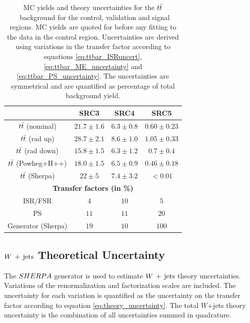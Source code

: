 \begin{table}[!h]
\begin{center}
      \begin{tabular}{|c|c|c|c|}
	\noalign{\smallskip}\noalign{\smallskip}\hline
          & SRC3 & SRC4 & SRC5 \\
        \hline
$t\bar{t}$ (nominal) &         $21.7\pm 1.6 $&         $6.3\pm 0.8 $&          $0.60\pm 0.23 $\\
$t\bar{t}$ (rad up)&         $28.7\pm 2.1 $&         $8.6\pm 1.0 $&  $1.05\pm 0.33 $\\
$t\bar{t}$ (rad down)&         $15.8\pm 1.5 $&         $6.3\pm 1.2 $&  $0.7\pm 0.4 $\\
$t\bar{t}$ (Powheg+H++)&         $18.0\pm 1.5 $&         $6.5\pm 0.9 $&  $0.46\pm 0.18 $\\
$t\bar{t}$ (Sherpa)&     $22\pm 5 $&     $7.4\pm 3.2 $&          $<0.01$\\        
        \hline
        \multicolumn{4}{c}{\bf Transfer factors (in \%)} \\ \hline
        ISR/FSR  &   $4$&    $10$&   $5$\\
        PS &    $11$&   $11$&   $20$\\
        Generator (Sherpa)  &    $19$&   $10$&   $100$\\
        \hline       
        \end{tabular}
       
        
    \end{center}
    \caption{MC yields and theory uncertainties for the $t\bar{t}$\ background for the control, validation and signal regions.  MC yields are quoted for before any fitting to the data in the control region. Uncertainties are derived using variations in the transfer factor according to equations \ref{eq:ttbar_ISRuncert}, \ref{eq:ttbar_ME_uncertainty} and \ref{eq:ttbar_PS_uncertainty}. The uncertainties are symmetrical and are quantified as percentage of total background yield. }
    \label{tab:ttbar_unc_SRC}
  \end{table}

\subsection{$W\,+\,\mathrm{jets}$ Theoretical Uncertainty}

\indent The $SHERPA$ generator is used to estimate $W\,+\,\mathrm{jets}$ theory uncertainties.  Variations of the renormalization and factorization scales are included.  The uncertainty for each variation is quantified as the uncertainty on the transfer factor according to equation \ref{eq:theory_uncertainty}.  The total $W$+jets theory uncertainty is the combination of all uncertainties summed in quadrature. \\

